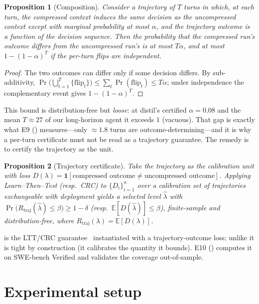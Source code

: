\documentclass[11pt]{article}
\newtheorem{proposition}{Proposition}
\begin{document}
\begin{proposition}[Composition]\label{prop:compose}
Consider a trajectory of $T$ turns in which, at each turn, the compressed context induces the
same decision as the uncompressed context except with marginal probability at most $\alpha$,
and the trajectory outcome is a function of the decision sequence. Then the probability that
the compressed run's outcome differs from the uncompressed run's is at most $T\alpha$, and at
most $1-(1-\alpha)^{T}$ if the per-turn flips are independent.
\end{proposition}
\begin{proof}
The two outcomes can differ only if some decision differs. By sub-additivity,
$\Pr\!\big(\bigcup_{t=1}^{T}\{\text{flip}_t\}\big)\le\sum_{t}\Pr(\text{flip}_t)\le T\alpha$;
under independence the complementary event gives $1-(1-\alpha)^{T}$.
\end{proof}

\noindent This bound is distribution-free but \emph{loose}: at distil's certified
$\alpha=0.08$ and the mean $T\approx27$ of our long-horizon agent it exceeds $1$ (vacuous).
That gap is exactly what E9 () measures---only $\approx1.8$ turns are
outcome-determining---and it is why a per-turn certificate must not be read as a trajectory
guarantee. The remedy is to certify the trajectory as the unit.

\begin{proposition}[Trajectory certificate]\label{prop:trajcert}
Take the trajectory as the calibration unit with loss
$D(\lambda)=\mathbf 1[\text{compressed outcome}\neq\text{uncompressed outcome}]$. Applying
Learn--Then--Test (resp.\ CRC) to $\{D_i\}_{i=1}^{n}$ over a calibration set of trajectories
exchangeable with deployment yields a selected level $\hat\lambda$ with
$\Pr\!\big(R_{\mathrm{traj}}(\hat\lambda)\le\beta\big)\ge 1-\delta$
(resp.\ $\mathbb E[D(\hat\lambda)]\le\beta$), finite-sample and distribution-free, where
$R_{\mathrm{traj}}(\lambda)=\mathbb E[D(\lambda)]$.
\end{proposition}
\noindent {} is the LTT/CRC guarantee~\cite{ltt,crc} instantiated with a
trajectory-outcome loss; unlike  it is tight by construction (it calibrates
the quantity it bounds). E10 () computes it on SWE-bench Verified and validates
the coverage out-of-sample.

\section{Experimental setup}
\end{document}
